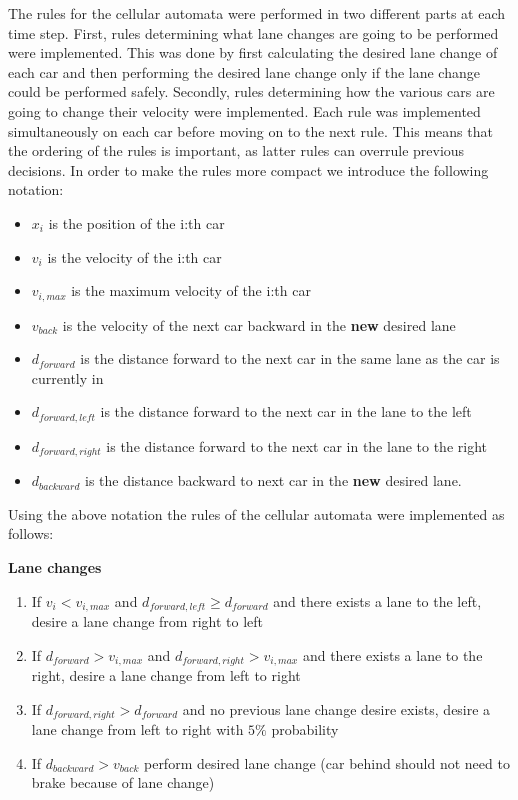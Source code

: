 \documentclass[a4paper,12pt]{article}
\begin{document}
The rules for the cellular automata were performed in two different parts at each time step.
First, rules determining what lane changes are going to be performed were implemented. This was done by first calculating the desired lane change of each car and then
performing the desired lane change only if the lane change could be performed safely.
Secondly, rules determining how the various cars are going to change their velocity were implemented.
Each rule was implemented simultaneously on each car before moving on to the next rule. This means that the ordering of the rules is important, as latter rules can overrule previous decisions.
In order to make the rules more compact we introduce the following notation:

\begin{itemize}
    \item $x_i$ is the position of the i:th car
    \item $v_i$ is the velocity of the i:th car
    \item $v_{i, max}$ is the maximum velocity of the i:th car
    \item $v_{back}$ is the velocity of the next car backward in the \textbf{new} desired lane
    \item $d_{forward}$ is the distance forward to the next car in the same lane as the car is currently in
    \item $d_{forward, left}$ is the distance forward to the next car in the lane to the left
    \item $d_{forward, right}$ is the distance forward to the next car in the lane to the right
    \item $d_{backward}$ is the distance backward to next car in the \textbf{new} desired lane.
\end{itemize}

Using the above notation the rules of the cellular automata were implemented as follows:

\vspace{5pt}
\textbf{Lane changes}
\begin{enumerate}
    \item If $v_i<v_{i,max}$ and $d_{forward, left}\geq d_{forward}$ and there exists a lane to the left, desire a lane change from right to left
    \item If $d_{forward} > v_{i, max}$ and $d_{forward, right} > v_{i, max}$ and there exists a lane to the right, desire a lane change from left to right
    \item If $d_{forward, right} > d_{forward}$ and no previous lane change desire exists, desire a lane change from left to right with $5\%$ probability
    \item If $d_{backward} > v_{back}$ perform desired lane change (car behind should not need to brake because of lane change)
\end{enumerate}
\end{document}
